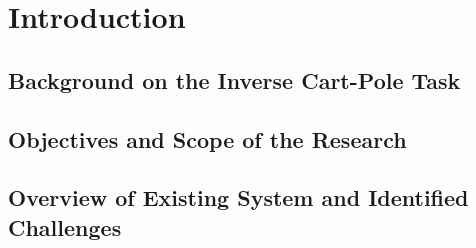 \chapter{Introduction}


\section{Background on the Inverse Cart-Pole Task}

\section{Objectives and Scope of the Research}

\section{Overview of Existing System and Identified Challenges}